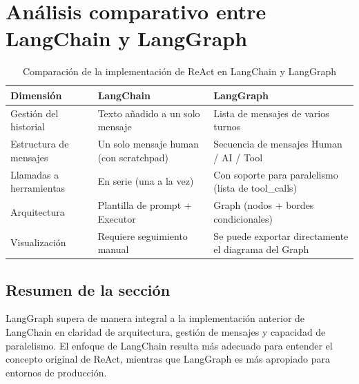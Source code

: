 \section{Análisis comparativo entre LangChain y LangGraph}

\begin{table}[H]
\centering
\begin{tabular}{lll}
\toprule
\textbf{Dimensión} & \textbf{LangChain} & \textbf{LangGraph} \\
\midrule
Gestión del historial & Texto añadido a un solo mensaje & Lista de mensajes de varios turnos \\
Estructura de mensajes & Un solo mensaje human (con scratchpad) & Secuencia de mensajes Human / AI / Tool \\
Llamadas a herramientas & En serie (una a la vez) & Con soporte para paralelismo (lista de tool\_calls) \\
Arquitectura & Plantilla de prompt + Executor & Graph (nodos + bordes condicionales) \\
Visualización & Requiere seguimiento manual & Se puede exportar directamente el diagrama del Graph \\
\bottomrule
\end{tabular}
\caption{Comparación de la implementación de ReAct en LangChain y LangGraph}
\end{table}

\subsection{Resumen de la sección}
LangGraph supera de manera integral a la implementación anterior de LangChain en claridad de arquitectura, gestión de mensajes y capacidad de paralelismo. El enfoque de LangChain resulta más adecuado para entender el concepto original de ReAct, mientras que LangGraph es más apropiado para entornos de producción.

